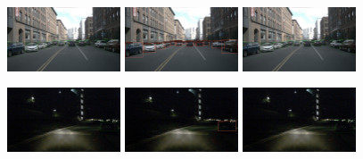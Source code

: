 \documentclass[report.tex]{subfiles}
\begin{document}
    \begin{figure}[h!]
        \centering
        \includegraphics[width=0.3\textwidth]{images/results/saf_vs_hrfuser/samples/s3_day_regular/n008-2018-08-01-15-34-25-0400__CAM_FRONT__1533152655412404_gt.png}
        \includegraphics[width=0.3\textwidth]{images/results/saf_vs_hrfuser/samples/s3_day_regular/n008-2018-08-01-15-34-25-0400__CAM_FRONT__1533152655412404_former.jpg}
        \includegraphics[width=0.3\textwidth]{images/results/saf_vs_hrfuser/samples/s3_day_regular/n008-2018-08-01-15-34-25-0400__CAM_FRONT__1533152655412404.png}
      
        \includegraphics[width=0.3\textwidth]{images/results/saf_vs_hrfuser/samples/s4_night_reg/n015-2018-11-14-19-52-02+0800__CAM_FRONT__1542196675862460_gt.png}
        \includegraphics[width=0.3\textwidth]{images/results/saf_vs_hrfuser/samples/s4_night_reg/n015-2018-11-14-19-52-02+0800__CAM_FRONT__1542196675862460_former.jpg}
        \includegraphics[width=0.3\textwidth]{images/results/saf_vs_hrfuser/samples/s4_night_reg/n015-2018-11-14-19-52-02+0800__CAM_FRONT__1542196675862460.png}
      

\end{figure}
\end{document}
